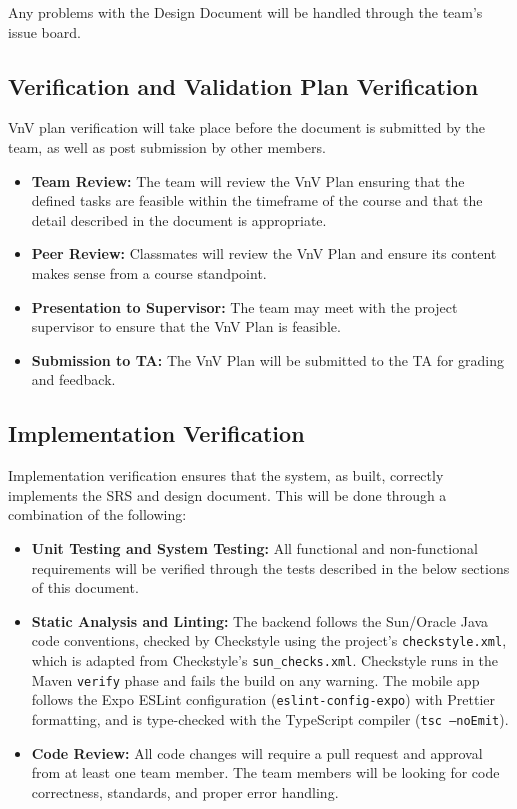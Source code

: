 \documentclass[12pt, titlepage]{article}
\begin{document}
Any problems with the Design Document will be handled through the team's issue board.


\subsection{Verification and Validation Plan Verification}

VnV plan verification will take place before the document is submitted by the team, as well as post submission by other members.
\begin{itemize}
  \item \textbf{Team Review:} The team will review the VnV Plan ensuring that the defined tasks are feasible within the timeframe of the course and that the detail described in the document is appropriate.
  \item \textbf{Peer Review:} Classmates will review the VnV Plan and ensure its content makes sense from a course standpoint.
  \item \textbf{Presentation to Supervisor:} The team may meet with the project supervisor to ensure that the VnV Plan is feasible.
  \item \textbf{Submission to TA:} The VnV Plan will be submitted to the TA for grading and feedback.
\end{itemize}

\subsection{Implementation Verification}\label{sec:impl_verification}

Implementation verification ensures that the system, as built, correctly implements the SRS and design document.
This will be done through a combination of the following:
\begin{itemize}
  \item \textbf{Unit Testing and System Testing:} All functional and non-functional requirements will be verified through the tests described in the below sections of this document.
  \item \sloppy\textbf{Static Analysis and Linting:} The backend follows the Sun/Oracle Java code conventions, checked by Checkstyle using the project's \texttt{checkstyle.xml}, which is adapted from Checkstyle's \texttt{sun\_checks.xml}. Checkstyle runs in the Maven \texttt{verify} phase and fails the build on any warning. The mobile app follows the Expo ESLint configuration (\texttt{eslint-\allowbreak config-\allowbreak expo}) with Prettier formatting, and is type-checked with the TypeScript compiler (\texttt{tsc --noEmit}).
  \item \textbf{Code Review:} All code changes will require a pull request and approval from at least one team member.
  The team members will be looking for code correctness, standards, and proper error handling.
\end{itemize}
\end{document}
